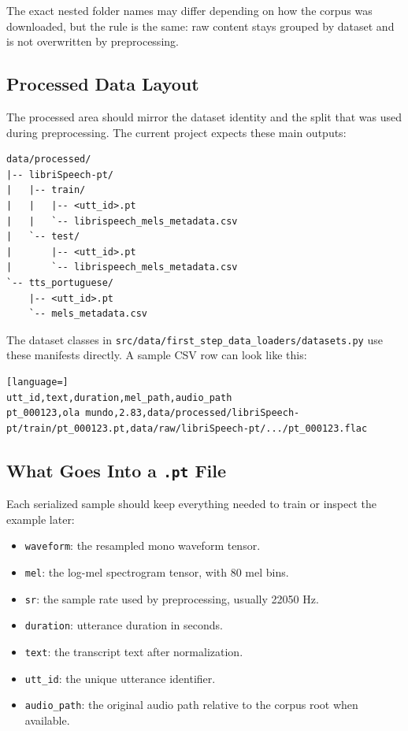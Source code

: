 \documentclass[11pt]{article}
\newcommand{\pathtt}[1]{\texttt{#1}}
\begin{document}
The exact nested folder names may differ depending on how the corpus was downloaded, but the rule is the same: raw content stays grouped by dataset and is not overwritten by preprocessing.

\subsection{Processed Data Layout}

The processed area should mirror the dataset identity and the split that was used during preprocessing. The current project expects these main outputs:

\begin{lstlisting}
data/processed/
|-- libriSpeech-pt/
|   |-- train/
|   |   |-- <utt_id>.pt
|   |   `-- librispeech_mels_metadata.csv
|   `-- test/
|       |-- <utt_id>.pt
|       `-- librispeech_mels_metadata.csv
`-- tts_portuguese/
    |-- <utt_id>.pt
    `-- mels_metadata.csv
\end{lstlisting}

The dataset classes in \pathtt{src/data/first\_step\_data\_loaders/datasets.py} use these manifests directly. A sample CSV row can look like this:

\begin{lstlisting}[language=]
utt_id,text,duration,mel_path,audio_path
pt_000123,ola mundo,2.83,data/processed/libriSpeech-pt/train/pt_000123.pt,data/raw/libriSpeech-pt/.../pt_000123.flac
\end{lstlisting}

\subsection{What Goes Into a \pathtt{.pt} File}

Each serialized sample should keep everything needed to train or inspect the example later:

\begin{itemize}[leftmargin=1.5em]
  \item \pathtt{waveform}: the resampled mono waveform tensor.
  \item \pathtt{mel}: the log-mel spectrogram tensor, with 80 mel bins.
  \item \pathtt{sr}: the sample rate used by preprocessing, usually 22050 Hz.
  \item \pathtt{duration}: utterance duration in seconds.
  \item \pathtt{text}: the transcript text after normalization.
  \item \pathtt{utt\_id}: the unique utterance identifier.
  \item \pathtt{audio\_path}: the original audio path relative to the corpus root when available.
\end{itemize}
\end{document}
